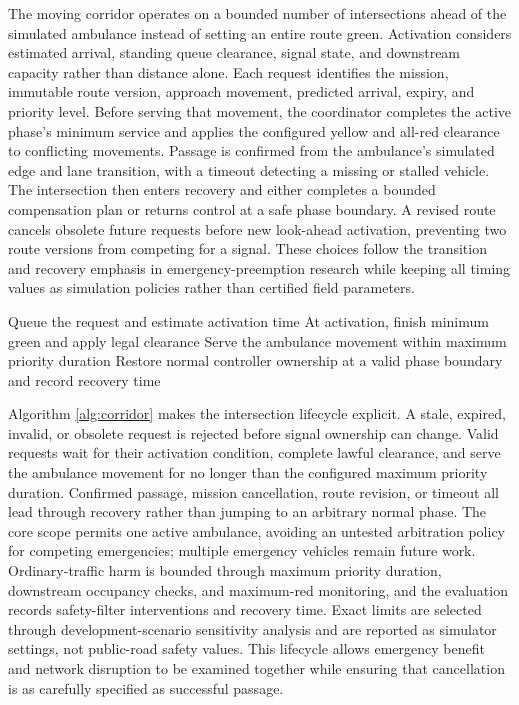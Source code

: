The moving corridor operates on a bounded number of intersections ahead of the simulated ambulance instead of setting an entire route green. Activation considers estimated arrival, standing queue clearance, signal state, and downstream capacity rather than distance alone. Each request identifies the mission, immutable route version, approach movement, predicted arrival, expiry, and priority level. Before serving that movement, the coordinator completes the active phase's minimum service and applies the configured yellow and all-red clearance to conflicting movements. Passage is confirmed from the ambulance's simulated edge and lane transition, with a timeout detecting a missing or stalled vehicle. The intersection then enters recovery and either completes a bounded compensation plan or returns control at a safe phase boundary. A revised route cancels obsolete future requests before new look-ahead activation, preventing two route versions from competing for a signal. These choices follow the transition and recovery emphasis in emergency-preemption research \cite{qin2012preemption} while keeping all timing values as simulation policies rather than certified field parameters.

\begin{algorithm}[H]
\caption{Corridor lifecycle at one intersection}
\label{alg:corridor}
Queue the request and estimate activation time\;
At activation, finish minimum green and apply legal clearance\;
Serve the ambulance movement within maximum priority duration\;
Restore normal controller ownership at a valid phase boundary and record recovery time\;
\end{algorithm}

Algorithm \ref{alg:corridor} makes the intersection lifecycle explicit. A stale, expired, invalid, or obsolete request is rejected before signal ownership can change. Valid requests wait for their activation condition, complete lawful clearance, and serve the ambulance movement for no longer than the configured maximum priority duration. Confirmed passage, mission cancellation, route revision, or timeout all lead through recovery rather than jumping to an arbitrary normal phase. The core scope permits one active ambulance, avoiding an untested arbitration policy for competing emergencies; multiple emergency vehicles remain future work. Ordinary-traffic harm is bounded through maximum priority duration, downstream occupancy checks, and maximum-red monitoring, and the evaluation records safety-filter interventions and recovery time. Exact limits are selected through development-scenario sensitivity analysis and are reported as simulator settings, not public-road safety values. This lifecycle allows emergency benefit and network disruption to be examined together while ensuring that cancellation is as carefully specified as successful passage.

